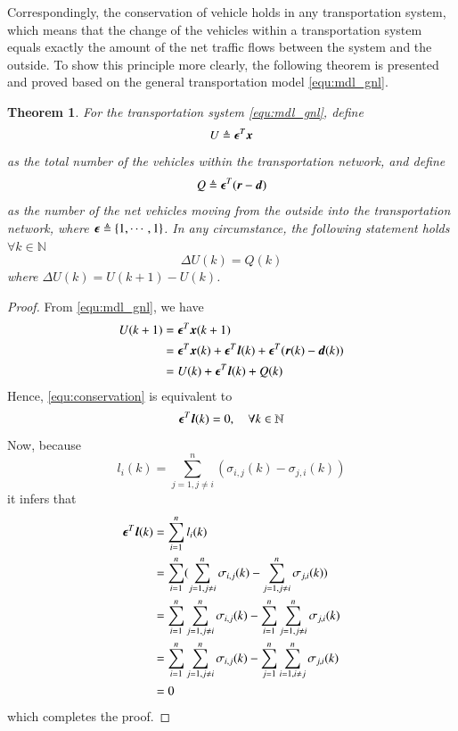 \documentclass[preprint,authoryear,12pt]{elsarticle}
\renewcommand{\vec}[1]{\mbox{\boldmath$#1$}}
\newtheorem{thm}{Theorem}
\begin{document}
Correspondingly, the conservation of vehicle holds in any transportation system, which means that the change of the vehicles within a transportation system equals exactly the amount of the net traffic flows between the system and the outside. To show this principle more clearly, the following theorem is presented and proved based on the general transportation model \eqref{equ:mdl_gnl}.

\begin{thm}\label{thm:conservation}
For the transportation system \eqref{equ:mdl_gnl}, define
\begin{equation}\label{equ:total_vehicle}
U \triangleq \vec{\epsilon}^T\vec{x}
\end{equation}
as the total number of the vehicles within the transportation network, and define
\begin{equation}\label{equ:all_io}
Q \triangleq \vec{\epsilon}^T(\vec{r}-\vec{d})
\end{equation}
as the number of the net vehicles moving from the outside into the transportation network, where $\vec{\epsilon} \triangleq \{1,\cdots,1\}$. In any circumstance, the following statement holds $\forall k\in\mathbb{N}$
\begin{equation}\label{equ:conservation}
\Delta U(k) = Q(k)
\end{equation}
where $\Delta U(k)=U(k+1)-U(k)$.
\end{thm}
\begin{proof}
From \eqref{equ:mdl_gnl}, we have
\begin{align*}
U(k+1) &= \vec{\epsilon}^T\vec{x}(k+1)\\
       &=
\vec{\epsilon}^T\vec{x}(k)+\vec{\epsilon}^T\vec{l}(k)+\vec{\epsilon}
^T(\vec{r}(k)-\vec{d}(k))\\
       &= U(k)+\vec{\epsilon}^T\vec{l}(k)+Q(k)
\end{align*}
Hence, \eqref{equ:conservation} is equivalent to
$$\vec{\epsilon}^T\vec{l}(k)=0,\quad \forall k\in\mathbb{N}$$
Now, because
$$l_i(k)=\sum_{j=1,j\neq i}^{n}(\sigma_{i,j}(k)-\sigma_{j,i}(k))$$
it infers that
\begin{align*}
\vec{\epsilon}^T\vec{l}(k) &= \sum_{i=1}^n l_i(k)\\
    &= \sum_{i=1}^n (\sum_{j=1,j\neq i}^{n} \sigma_{i,j}(k)
       -\sum_{j=1,j\neq i}^{n} \sigma_{j,i}(k))\\
    &= \sum_{i=1}^n \sum_{j=1,j\neq i}^{n} \sigma_{i,j}(k)
       -\sum_{i=1}^n \sum_{j=1,j\neq i}^{n} \sigma_{j,i}(k)\\
    &= \sum_{i=1}^n \sum_{j=1,j\neq i}^{n} \sigma_{i,j}(k)
       -\sum_{j=1}^n \sum_{i=1,i\neq j}^{n} \sigma_{j,i}(k)\\
    &= 0
\end{align*}
which completes the proof.
\end{proof}
\end{document}
